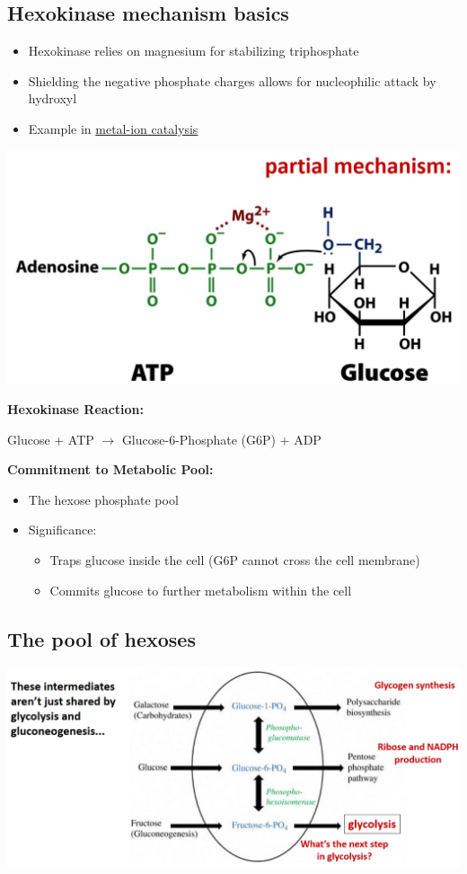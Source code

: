 \documentclass[10pt]{article}
\begin{document}
\subsection*{Hexokinase mechanism basics}
\begin{itemize}
	\item Hexokinase relies on magnesium for stabilizing triphosphate
	\item Shielding the negative phosphate charges allows for nucleophilic attack by hydroxyl
	\item Example in \underline{metal-ion catalysis}
\end{itemize}
\begin{center} 
	\includegraphics*[width=\textwidth]{L1_2.png}
\end{center}
\textbf{Hexokinase Reaction:}
\begin{center}
    Glucose + ATP $\rightarrow$ Glucose-6-Phosphate (G6P) + ADP
\end{center}
\textbf{Commitment to Metabolic Pool:}
\begin{itemize}
	\item The hexose phosphate pool
	\item Significance:
	\begin{itemize}
        \item Traps glucose inside the cell (G6P cannot cross the cell membrane)
        \item Commits glucose to further metabolism within the cell
    \end{itemize}
\end{itemize}

\subsection*{The pool of hexoses}
\begin{center} 
	\includegraphics*[width=\textwidth]{L1_3.png}
\end{center}
\end{document}
